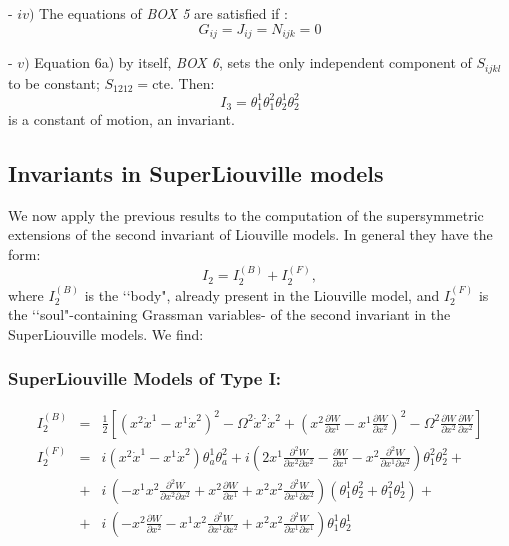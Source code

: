 \documentclass[a4paper,11pt,twoside]{article}
\begin{document}
\vspace*{0.1cm}

- $iv)$ The equations of {\it BOX 5} are satisfied if :
\[
G_{ij}=J_{ij}=N_{ijk}=0
\]

\vspace*{0.1cm}

- $v)$ Equation 6a) by itself, {\it BOX 6}, sets the only
independent component of  $S_{ijkl}$ to be constant; $
S_{1212}=\mbox{cte}$. Then:
\[
I_3=\theta_1^1 \theta_1^2 \theta_2^1 \theta_2^2
\]
is a constant of motion, an invariant.

\subsection{Invariants in SuperLiouville models}

We now apply the previous results to the computation of the
supersymmetric extensions of the second invariant of Liouville
models. In general they have the form:
\[
I_2=I_2^{(B)}+I_2^{(F)},
\]
where $I_2^{(B)}$ is the \lq\lq body", already present in the Liouville
model, and $I_2^{(F)}$ is the \lq\lq soul"-containing Grassman
variables- of the second invariant in the SuperLiouville models.
We find:


\subsubsection{SuperLiouville Models of Type I:}
\begin{eqnarray*}
I_2^{(B)}& =&\frac{1}{2} \left[ \left(x^2 \dot{x}^1- x^1 \dot{x}^2
\right)^2- \Omega^2 \dot{x}^2 \dot{x}^2 + \left(x^2 \frac{\partial
W}{\partial x^1} - x^1 \frac{\partial W}{\partial x^2}\right)^2-
\Omega^2 \frac{\partial W}{\partial x^2}\frac{\partial W}{\partial
x^2} \right] \\ I_2^{(F)}&=&i (x^2 \dot{x}^1 - x^1 \dot{x}^2)
\theta_a^1 \theta_a^2+i\left(2 x^1 \frac{\partial^2 W}{\partial
x^2
\partial x^2}-\frac{\partial W}{\partial x^1}-x^2 \frac{\partial^2
W}{\partial x^1 \partial x^2} \right) \theta_1^2 \theta_2^2 + \\ &
+&i \, \left(-x^1 x^2 \frac{\partial^2 W}{\partial x^2 \partial
x^2}+x^2 \frac{\partial W}{\partial x^1}+ x^2 x^2 \frac{\partial^2
W}{\partial x^1 \partial x^2}\right) (\theta_1^1
\theta_2^2+\theta_1^2 \theta_2^1) +\\ &  +&i \, \left(- x^2
\frac{\partial W}{\partial x^2}- x^1 x^2 \frac{\partial^2
W}{\partial x^1 \partial x^2}+ x^2 x^2 \frac{\partial^2
W}{\partial x^1 \partial x^1} \right) \theta_1^1 \theta_2^1
\end{eqnarray*}
\end{document}
